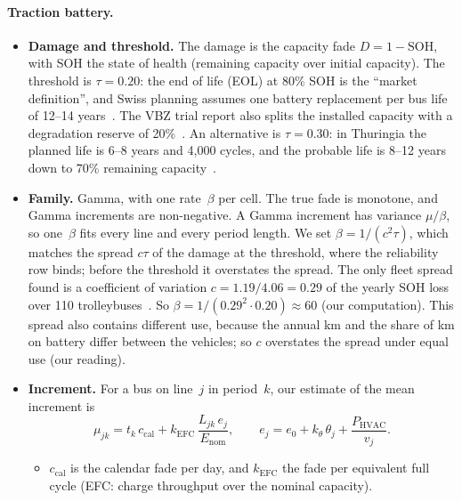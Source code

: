 \documentclass[11pt,a4paper]{article}
\theoremstyle{plain}
\theoremstyle{definition}
\theoremstyle{remark}
\begin{document}
\paragraph{Traction battery.}
\begin{itemize}
  \item \textbf{Damage and threshold.}
    The damage is the capacity fade $D = 1 - \mathrm{SOH}$, with SOH the state of health (remaining capacity over initial capacity).
    The threshold is $\tau = 0.20$: the end of life (EOL) at 80\% SOH is the ``market definition'', and Swiss planning assumes one battery replacement per bus life of 12--14 years~\cite[p.~28]{Kollegger2020mountain}.
    The VBZ trial report also splits the installed capacity with a degradation reserve of 20\%~\cite[p.~34]{VBZ2019}.
    An alternative is $\tau = 0.30$: in Thuringia the planned life is 6--8 years and 4,000 cycles, and the probable life is 8--12 years down to 70\% remaining capacity~\cite[p.~10]{ThEGA2025}.
  \item \textbf{Family.}
    Gamma, with one rate~$\beta$ per cell.
    The true fade is monotone, and Gamma increments are non-negative.
    A Gamma increment has variance $\mu/\beta$, so one~$\beta$ fits every line and every period length.
    We set $\beta = 1/(c^2\tau)$, which matches the spread $c\tau$ of the damage at the threshold, where the reliability row binds; before the threshold it overstates the spread.
    The only fleet spread found is a coefficient of variation $c = 1.19/4.06 = 0.29$ of the yearly SOH loss over 110 trolleybuses~\cite[Table~9, p.~21]{Malozyomov2026trolleybus}.
    So $\beta = 1/(0.29^2 \cdot 0.20) \approx 60$ (our computation).
    This spread also contains different use, because the annual km and the share of km on battery differ between the vehicles; so $c$ overstates the spread under equal use (our reading).
  \item \textbf{Increment.}
    For a bus on line~$j$ in period~$k$, our estimate of the mean increment is
    \begin{equation}\label{eq:cs_battery}
      \mu_{jk} = t_k\, c_{\mathrm{cal}} + k_{\mathrm{EFC}}\,\frac{L_{jk}\, e_j}{E_{\mathrm{nom}}},
      \qquad
      e_j = e_0 + k_\theta\, \theta_j + \frac{P_{\mathrm{HVAC}}}{v_j}.
    \end{equation}
    \begin{itemize}
      \item $c_{\mathrm{cal}}$ is the calendar fade per day, and $k_{\mathrm{EFC}}$ the fade per equivalent full cycle (EFC: charge throughput over the nominal capacity).

\end{itemize}
\end{itemize}
\end{document}
